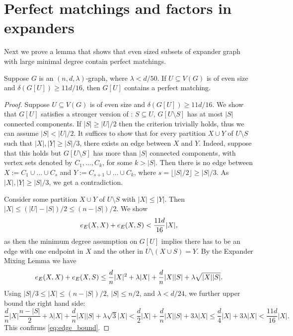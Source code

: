 \documentclass[11pt]{article}
\begin{document}



\section{Perfect matchings and factors in expanders}

Next we prove a lemma that shows that even sized subsets of expander graph with large minimal degree contain perfect matchings.
\begin{lemma}\label{thm:perfect-matching}
Suppose $G$ is an $(n, d, \lambda)$-graph, where $\lambda < d/50$. If $U \subseteq V(G)$ is of even size and $\delta(G[U]) \ge 11d/16$, then $G[U]$ contains a perfect matching.
\end{lemma}

\begin{proof}
  Suppose $U \subseteq V(G)$ is of even size and $\delta(G[U]) \ge 11d/16$.
  We show that $G[U]$ satisfies a stronger version of :  $S \subseteq U$, $G[U \setminus S]$ has at most $|S|$ connected components.
  If $|S| \ge |U|/2$ then the criterion trivially holds, thus we can assume $|S| < |U|/2$.
  It suffices to show that for every partition $X \cup Y$ of $U \setminus S$ such that $|X|, |Y| \ge |S|/3$, there exists an edge between $X$ and $Y$.
  Indeed, suppose that this holds but $G[U \setminus S]$ has more than $|S|$ connected components, with vertex sets denoted by $C_1, \ldots, C_k$, for some $k > |S|$.
  Then there is no edge between $X := C_1 \cup \ldots \cup C_{s}$ and $Y := C_{s+1} \cup \ldots \cup C_{k}$, where $s = \lfloor |S|/2 \rfloor \ge |S|/3$. As $|X|, |Y| \ge |S|/3$, we get a contradiction.

    Consider some partition $X \cup Y$ of $U \setminus S$ with $|X| \le |Y|$. Then $|X| \le (|U| - |S|)/2 \le (n - |S|)/2$. We show
    \begin{equation} \label{eq:edge_bound}
        \CutEdges{X}{X}{E} + \CutEdges{X}{S}{E} < \frac{11d}{16}|X|,
    \end{equation}
    as then the minimum degree assumption on $G[U]$ implies there has to be an edge with one endpoint in $X$ and the other in $U \setminus (X \cup S) = Y$. By the Expander Mixing Lemma we have
    \[
        \CutEdges{X}{X}{E} + \CutEdges{X}{S}{E} \le \frac{d}{n}|X|^2 + \lambda |X| + \frac{d}{n}|X||S| + \lambda\sqrt{|X||S|}.
    \]
    Using $|S|/3 \le |X| \le (n-|S|)/2$, $|S| \le n/2$, and $\lambda < d/24$,  we further upper bound the right hand side:
    \[
        \frac{d}{n} |X| \frac{n-|S|}{2} + \lambda |X| + \frac{d}{n}|X||S| + \lambda\sqrt{3} |X| < \frac{d}{2}|X| + \frac{d}{n}|X||S| + 3 \lambda |X| \le \frac{d}{4} |X| + 3\lambda |X| < \frac{11d}{16}|X|.
    \]
    This confirms \eqref{eq:edge_bound}.
\end{proof}
\end{document}
